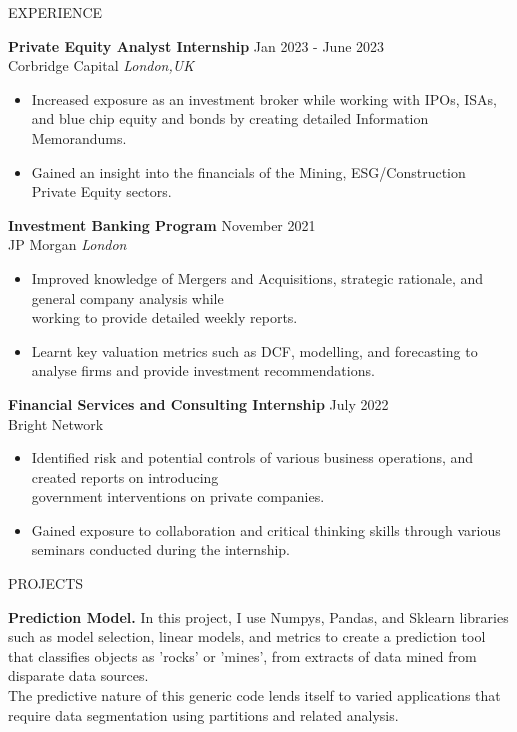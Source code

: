 \documentclass{resume} %
\begin{document}
\begin{rSection}{EXPERIENCE}

\textbf{Private Equity Analyst Internship} \hfill Jan 2023 - June 2023\\
Corbridge Capital \hfill \textit{London,UK}
 \begin{itemize}
    \itemsep -3pt {} 
     \item Increased exposure as an investment broker while working with IPOs, ISAs, and blue chip equity and bonds by creating detailed Information Memorandums.
     \item Gained an insight into the financials of the Mining, ESG/Construction Private Equity sectors. 
 \end{itemize}
 
\textbf{Investment Banking Program} \hfill November 2021\\
JP Morgan \hfill \textit{London}
 \begin{itemize}
    \itemsep -3pt {} 
     \item Improved knowledge of Mergers and Acquisitions, strategic rationale, and general company analysis while\\ working to provide detailed weekly reports.
     \item Learnt key valuation metrics such as DCF, modelling, and forecasting to analyse firms and provide investment recommendations. 
 \end{itemize}

 \textbf{Financial Services and Consulting Internship } \hfill July 2022\\
Bright Network 
 \begin{itemize}
    \itemsep -3pt {} 
     \item Identified risk and potential controls of various business operations, and created reports on introducing\\ government interventions on private companies.
     \item Gained exposure to collaboration and critical thinking skills through various seminars conducted during the internship.
 \end{itemize}

\end{rSection} 


\begin{rSection}{PROJECTS}
\vspace{-1.25em}
\item \textbf{Prediction Model.} {In this project, I use Numpys, Pandas, and Sklearn libraries such as model selection, linear models, and metrics to create a prediction tool that classifies objects as 'rocks' or 'mines', from extracts of data mined from disparate data sources.\\ The predictive nature of this generic code lends itself to varied applications that require data segmentation using partitions and related analysis.}
\end{rSection} 

\end{document}
